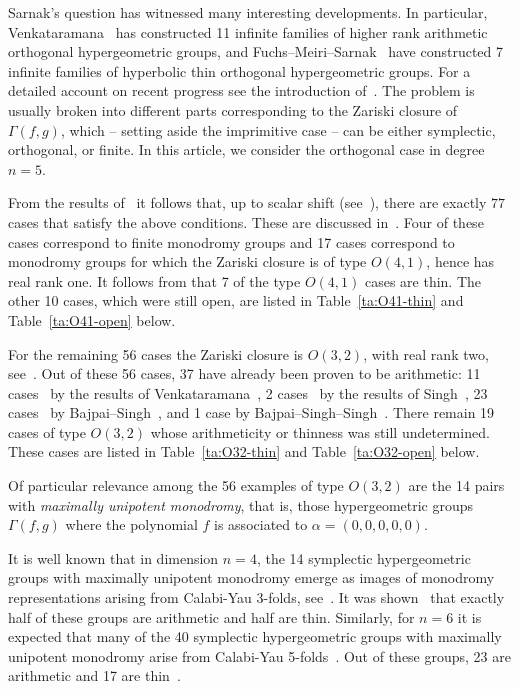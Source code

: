 \documentclass[11pt,a4paper]{amsart}
\theoremstyle{definition}
\theoremstyle{definition}
\numberwithin{equation}{section}
\begin{document}
Sarnak's question has witnessed many interesting developments.
In particular, Venkataramana~\cite{V17} has constructed 11 infinite families of higher rank arithmetic orthogonal hypergeometric groups, and Fuchs--Meiri--Sarnak~\cite{FMS} have constructed 7 infinite families of hyperbolic thin orthogonal hypergeometric groups.
For a detailed account on recent progress see the introduction of~\cite{bdss}.
The problem is usually broken into different parts corresponding to the Zariski closure of $\Gamma(f,g)$, which -- setting aside the imprimitive case \cite[Def.~5.1]{BH} -- can be either symplectic, orthogonal, or finite.
In this article, we consider the orthogonal case in degree $n=5$.

From the results of~\cite{BH} it follows that, up to scalar shift (see~\cite[Def.~5.5]{BH}), there are exactly $77$ cases that satisfy the above conditions. These are discussed in~\cite{BS}.
Four of these cases correspond to finite monodromy groups and 17 cases correspond to monodromy groups for which the Zariski closure is of type $O(4,1)$, hence has real rank one.
It follows from \cite{FMS} that 7 of the type $O(4,1)$ cases are thin. The other 10 cases, which were still open, are listed in Table~\ref{ta:O41-thin} and Table~\ref{ta:O41-open} below.

For the remaining 56 cases the Zariski closure is $O(3,2)$, with real rank two, see~\cite{BS}.
Out of these 56 cases, 37 have already been proven to be arithmetic: 11 cases~\cite[Table~2]{BS} by the results of Venkataramana~\cite{V17}, 2 cases~\cite[Table~3]{BS} by the results of Singh~\cite{S15O}, 23 cases~\cite[Table~4]{BS} by Bajpai--Singh~\cite{BS}, and 1 case by Bajpai--Singh--Singh~\cite{BSS}.
There remain 19 cases of type $O(3,2)$ whose arithmeticity or thinness was still undetermined. These cases are listed in Table~\ref{ta:O32-thin} and Table~\ref{ta:O32-open} below.
\vspace{0.2cm}

Of particular relevance among the 56 examples of type $O(3,2)$ are the 14 pairs with \emph{maximally unipotent monodromy}, that is, those hypergeometric groups $\Gamma(f,g)$ where the polynomial $f$ is associated to $\alpha=\left(0,0,0,0,0\right)$.

It is well known that in dimension $n=4$, the 14 symplectic hypergeometric groups with maximally unipotent monodromy emerge as images of monodromy representations arising from Calabi-Yau 3-folds, see~\cite{DM06}. It was shown~\cite{S15S, SV, BT} that exactly half of these groups are arithmetic and half are thin.
Similarly, for $n=6$ it is expected that many of the 40 symplectic hypergeometric groups with maximally unipotent monodromy arise from Calabi-Yau 5-folds~\cite{GMP,LTY}. Out of these groups, 23 are arithmetic and 17 are thin~\cite{bdss,BDN21,BDN22}.
\end{document}
